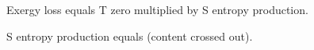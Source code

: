 Exergy loss equals T zero multiplied by S entropy production.  

S entropy production equals (content crossed out).